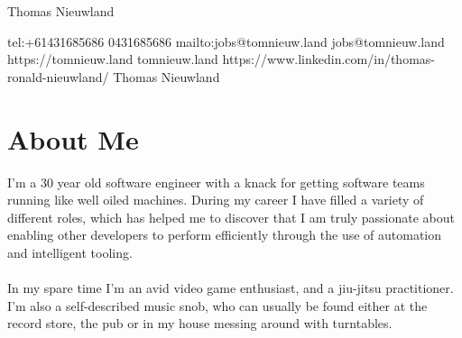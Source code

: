 \documentclass{resume}
\begin{document}
\ContactName
{Thomas Nieuwland}

\ContactInfoDigital
  {tel:+61431685686}
  {0431685686}
  {mailto:jobs@tomnieuw.land}
  {jobs@tomnieuw.land}
  {https://tomnieuw.land}
  {tomnieuw.land}
  {https://www.linkedin.com/in/thomas-ronald-nieuwland/}
  {Thomas Nieuwland}

\section{{\faUser} About Me}
I'm a 30 year old software engineer with a knack for getting software teams running like well oiled machines. During my 
career I have filled a variety of different roles, which has helped me to discover that I am truly passionate about 
enabling other developers to perform efficiently through the use of automation and intelligent tooling.
\\~\\
In my spare time I'm an avid video game enthusiast, and a jiu-jitsu practitioner. I'm also a self-described music
snob, who can usually be found either at the record store, the pub or in my house messing around with turntables.
\end{document}
